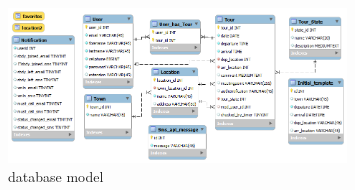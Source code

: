 \begin{figure}[ht]
	\centering
	\includegraphics[width=0.8\textwidth]{images/Datenbank_Model}
	\caption{database model}
	\label{img:DBMod}
\end{figure}